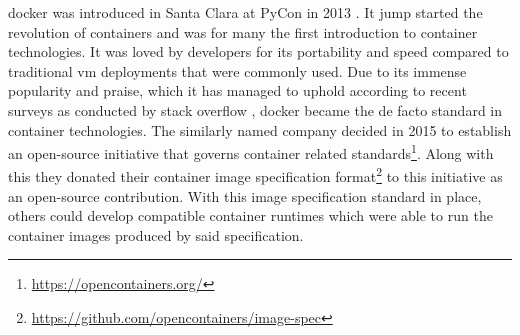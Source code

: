 \Gls{docker} was introduced in Santa Clara at PyCon in 2013 \cite{pycon2013}. It jump started the revolution of \glspl{container} and was for many the first introduction to \gls{container} technologies. It was loved by developers for its portability and speed compared to traditional \gls{vm} deployments that were commonly used. Due to its immense popularity and praise, which it has managed to uphold according to recent surveys as conducted by stack overflow \cite{stack-overflow-survey-2021}, \gls{docker} became the de facto standard in \gls{container} technologies. The similarly named company decided in 2015 to establish an open-source initiative that governs \gls{container} related standards\footnote{\url{https://opencontainers.org/}}. Along with this they donated their container image specification format\footnote{\url{https://github.com/opencontainers/image-spec}} to this initiative as an open-source contribution. With this image specification standard in place, others could develop compatible container runtimes which were able to run the container images produced by said specification.
